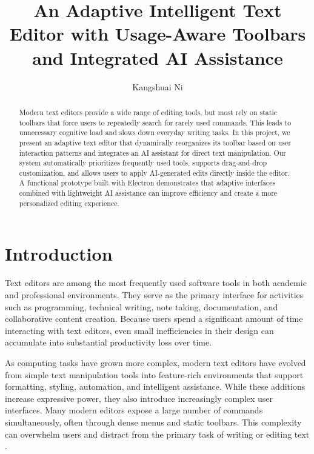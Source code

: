 \documentclass[sigconf]{acmart}
\title{An Adaptive Intelligent Text Editor with Usage-Aware Toolbars and Integrated AI Assistance}
\author{Kangshuai Ni}
\affiliation{%
\institution{Stony Brook University}
\department{Department of Computer Science}
}
\begin{document}
\begin{abstract}
Modern text editors provide a wide range of editing tools, but most rely on static toolbars that force users to repeatedly search for rarely used commands. This leads to unnecessary cognitive load and slows down everyday writing tasks. In this project, we present an adaptive text editor that dynamically reorganizes its toolbar based on user interaction patterns and integrates an AI assistant for direct text manipulation. Our system automatically prioritizes frequently used tools, supports drag-and-drop customization, and allows users to apply AI-generated edits directly inside the editor. A functional prototype built with Electron demonstrates that adaptive interfaces combined with lightweight AI assistance can improve efficiency and create a more personalized editing experience.
\end{abstract}


\maketitle

\section{Introduction}

Text editors are among the most frequently used software tools in both academic and professional environments. They serve as the primary interface for activities such as programming, technical writing, note taking, documentation, and collaborative content creation. Because users spend a significant amount of time interacting with text editors, even small inefficiencies in their design can accumulate into substantial productivity loss over time.

As computing tasks have grown more complex, modern text editors have evolved from simple text manipulation tools into feature-rich environments that support formatting, styling, automation, and intelligent assistance. While these additions increase expressive power, they also introduce increasingly complex user interfaces. Many modern editors expose a large number of commands simultaneously, often through dense menus and static toolbars. This complexity can overwhelm users and distract from the primary task of writing or editing text \cite{Hamdani2025_AdaptiveHCI}. 
\end{document}
